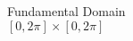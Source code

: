 \documentclass[preview]{standalone}
\begin{document}
\begin{center}
Fundamental Domain\\$[0, 2\pi] \times [0, 2\pi]$
\end{center}
\end{document}
